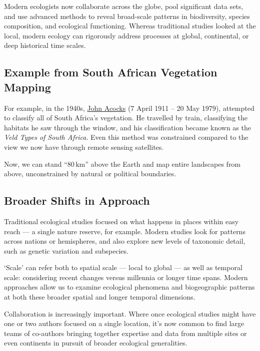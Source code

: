 \documentclass[
  11pt,
]{book}
\begin{document}
Modern ecologists now collaborate across the globe, pool significant
data sets, and use advanced methods to reveal broad-scale patterns in
biodiversity, species composition, and ecological functioning. Whereas
traditional studies looked at the local, modern ecology can rigorously
address processes at global, continental, or deep historical time
scales.

\subsection{Example from South African Vegetation
Mapping}\label{example-from-south-african-vegetation-mapping}

For example, in the 1940s,
\href{https://en.wikipedia.org/wiki/John_Phillip_Harison_Acocks}{John
Acocks} (7 April 1911 -- 20 May 1979), attempted to classify all of
South Africa's vegetation. He travelled by train, classifying the
habitats he saw through the window, and his classification became known
as the \emph{Veld Types of South Africa}. Even this method was
constrained compared to the view we now have through remote sensing
satellites.

Now, we can stand ``\(80\,\mathrm{km}\)'' above the Earth and map entire
landscapes from above, unconstrained by natural or political boundaries.

\subsection{Broader Shifts in
Approach}\label{broader-shifts-in-approach}

Traditional ecological studies focused on what happens in places within
easy reach --- a single nature reserve, for example. Modern studies look
for patterns across nations or hemispheres, and also explore new levels
of taxonomic detail, such as genetic variation and subspecies.

`Scale' can refer both to spatial scale --- local to global --- as well
as temporal scale: considering recent changes versus millennia or longer
time spans. Modern approaches allow us to examine ecological phenomena
and biogeographic patterns at both these broader spatial and longer
temporal dimensions.

Collaboration is increasingly important. Where once ecological studies
might have one or two authors focused on a single location, it's now
common to find large teams of co-authors bringing together expertise and
data from multiple sites or even continents in pursuit of broader
ecological generalities.
\end{document}
